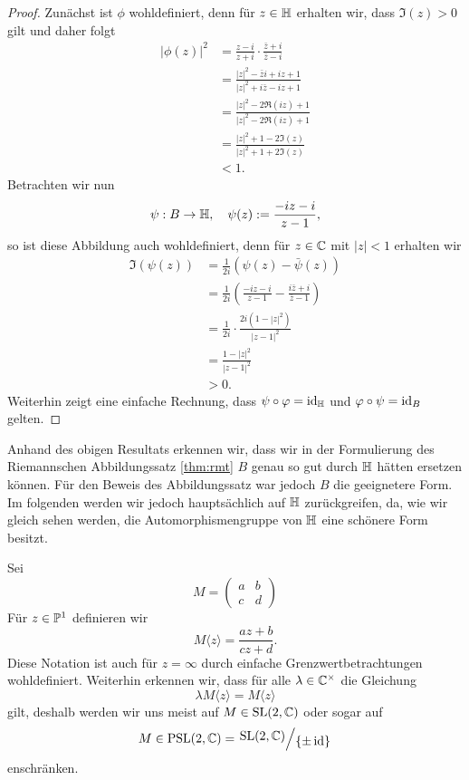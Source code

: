 \begin{proof}
  Zunächst ist $\phi$ wohldefiniert, denn für $z \in \h$ erhalten wir,
  dass $\Im(z) > 0$ gilt und daher folgt
  \begin{align*}
    |\phi(z)|^2 & = \frac{z-i}{z+i} \cdot \frac{\bar z + i}{\bar z -
      i} \\
    & = \frac{|z|^2 - \bar z i + i z + 1}{|z|^2 +i \bar z - i z + 1}
    \\
    & = \frac{|z|^2 - 2 \Re(iz) + 1}{|z|^2 - 2 \Re(iz) + 1} \\
    & = \frac{|z|^2 +1 - 2 \Im(z)}{|z|^2 + 1 + 2\Im(z)} \\
    & < 1.
  \end{align*}
  Betrachten wir nun
  \[
  \psi: B \ra \h, \quad \psi(z) := \frac{ -iz - i}{z-1},
  \]
  so ist diese Abbildung auch wohldefiniert, denn für $z \in \C$ mit
  $|z| < 1$ erhalten wir
  \begin{align*}
    \Im(\psi(z)) & = \frac{1}{2i} ( \psi(z) - \bar \psi(z)) \\
    & = \frac{1}{2i} \left ( \frac{-iz - i}{z -1 } - \frac{ i \bar z +
        i}{\bar z - 1} \right ) \\
    & = \frac{1}{2i} \cdot \frac{2i ( 1- |z|^2 )}{|z -1|^2} \\
    & = \frac{1- |z|^2}{|z-1|^2} \\
    & > 0.
  \end{align*}
  Weiterhin zeigt eine einfache Rechnung, dass $\psi \circ \phi =
  \id_\h$ und $\phi \circ \psi = \id_B$ gelten.
\end{proof}

\begin{rem}
  Anhand des obigen Resultats erkennen wir, dass wir in der Formulierung
  des Riemannschen Abbildungssatz \ref{thm:rmt} $B$ genau so gut durch
  $\h$ hätten ersetzen können. Für den Beweis des Abbildungssatz war
  jedoch $B$ die geeignetere Form. Im folgenden werden wir jedoch
  hauptsächlich auf $\h$ zurückgreifen, da, wie wir gleich sehen
  werden, die Automorphismengruppe von $\h$ eine schönere Form besitzt.
\end{rem}

\begin{defin}
  Sei
  \[
  M =
  \begin{pmatrix}
    a & b \\
    c & d
  \end{pmatrix}
  \]
  Für $z \in \P^1$ definieren wir
  \[
  M \langle z \rangle = \frac{az+b}{cz+d}.
  \]
  Diese Notation ist auch für $z = \infty$ durch einfache
  Grenzwertbetrachtungen wohldefiniert. Weiterhin erkennen wir, dass
  für alle $\lambda \in \C^\times$ die Gleichung
  \[
  \lambda M \langle z \rangle = M \langle z \rangle
  \]
  gilt, deshalb werden wir uns meist auf $M \in \SL(2, \C)$ oder sogar auf
  \[
  M \in \PSL(2, \C) = \quot{\SL(2, \C)}{\{\pm \id\}}
  \]
  enschränken.
\end{defin}

